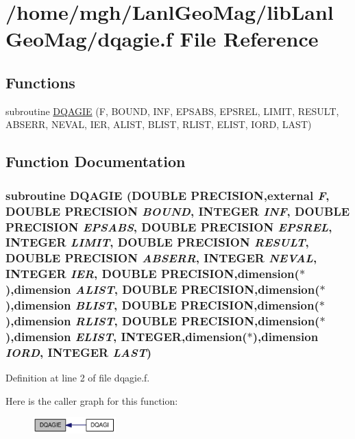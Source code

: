 \hypertarget{dqagie_8f}{
\section{/home/mgh/LanlGeoMag/libLanlGeoMag/dqagie.f File Reference}
\label{dqagie_8f}
}
\subsection*{Functions}
\begin{CompactItemize}
\item 
subroutine \hyperlink{dqagie_8f_9224a43ef38ca8c3dfe37ad1646d9ab4}{DQAGIE} (F, BOUND, INF, EPSABS, EPSREL, LIMIT, RESULT, ABSERR, NEVAL, IER, ALIST, BLIST, RLIST, ELIST, IORD, LAST)
\end{CompactItemize}


\subsection{Function Documentation}
\hypertarget{dqagie_8f_9224a43ef38ca8c3dfe37ad1646d9ab4}{
\subsubsection[{DQAGIE}]{\setlength{\rightskip}{0pt plus 5cm}subroutine DQAGIE (DOUBLE PRECISION,external {\em F}, \/  DOUBLE PRECISION {\em BOUND}, \/  INTEGER {\em INF}, \/  DOUBLE PRECISION {\em EPSABS}, \/  DOUBLE PRECISION {\em EPSREL}, \/  INTEGER {\em LIMIT}, \/  DOUBLE PRECISION {\em RESULT}, \/  DOUBLE PRECISION {\em ABSERR}, \/  INTEGER {\em NEVAL}, \/  INTEGER {\em IER}, \/  DOUBLE PRECISION,dimension($\ast$),dimension {\em ALIST}, \/  DOUBLE PRECISION,dimension($\ast$),dimension {\em BLIST}, \/  DOUBLE PRECISION,dimension($\ast$),dimension {\em RLIST}, \/  DOUBLE PRECISION,dimension($\ast$),dimension {\em ELIST}, \/  INTEGER,dimension($\ast$),dimension {\em IORD}, \/  INTEGER {\em LAST})}}
\label{dqagie_8f_9224a43ef38ca8c3dfe37ad1646d9ab4}




Definition at line 2 of file dqagie.f.

Here is the caller graph for this function:\nopagebreak
\begin{figure}[H]
\begin{center}
\leavevmode
\includegraphics[width=91pt]{dqagie_8f_9224a43ef38ca8c3dfe37ad1646d9ab4_icgraph}
\end{center}
\end{figure}

